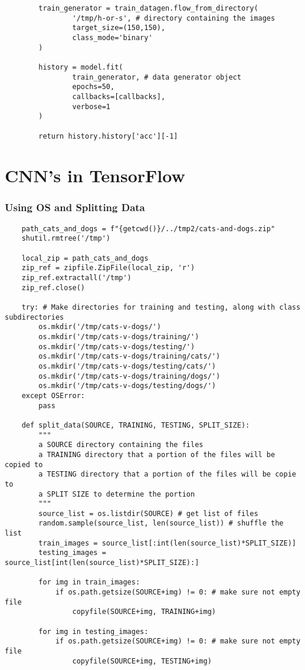\documentclass[11pt, a4paper]{article}
\begin{document}
\begin{spacing}{1.1}
\begin{lstlisting}
		train_generator = train_datagen.flow_from_directory(
				'/tmp/h-or-s', # directory containing the images
				target_size=(150,150),
				class_mode='binary'
		)

		history = model.fit(
				train_generator, # data generator object
				epochs=50,
				callbacks=[callbacks],
				verbose=1
		)
		
		return history.history['acc'][-1] \end{lstlisting}\newpage

	\section{CNN's in TensorFlow}
	\subsubsection{Using OS and Splitting Data}
	\begin{lstlisting}
	path_cats_and_dogs = f"{getcwd()}/../tmp2/cats-and-dogs.zip"
	shutil.rmtree('/tmp')
	
	local_zip = path_cats_and_dogs
	zip_ref = zipfile.ZipFile(local_zip, 'r')
	zip_ref.extractall('/tmp')
	zip_ref.close()
	
	try: # Make directories for training and testing, along with class subdirectories
		os.mkdir('/tmp/cats-v-dogs/')
		os.mkdir('/tmp/cats-v-dogs/training/')
		os.mkdir('/tmp/cats-v-dogs/testing/')
		os.mkdir('/tmp/cats-v-dogs/training/cats/')
		os.mkdir('/tmp/cats-v-dogs/testing/cats/')
		os.mkdir('/tmp/cats-v-dogs/training/dogs/')
		os.mkdir('/tmp/cats-v-dogs/testing/dogs/')
	except OSError:
		pass
		
	def split_data(SOURCE, TRAINING, TESTING, SPLIT_SIZE):
		"""
		a SOURCE directory containing the files
		a TRAINING directory that a portion of the files will be copied to
		a TESTING directory that a portion of the files will be copie to
		a SPLIT SIZE to determine the portion
		"""
		source_list = os.listdir(SOURCE) # get list of files
		random.sample(source_list, len(source_list)) # shuffle the list
		train_images = source_list[:int(len(source_list)*SPLIT_SIZE)]
		testing_images = source_list[int(len(source_list)*SPLIT_SIZE):]
		
		for img in train_images:
			if os.path.getsize(SOURCE+img) != 0: # make sure not empty file
				copyfile(SOURCE+img, TRAINING+img)
		
		for img in testing_images:
			if os.path.getsize(SOURCE+img) != 0: # make sure not empty file
				copyfile(SOURCE+img, TESTING+img)
		

\end{lstlisting}
\end{spacing}
\end{document}
